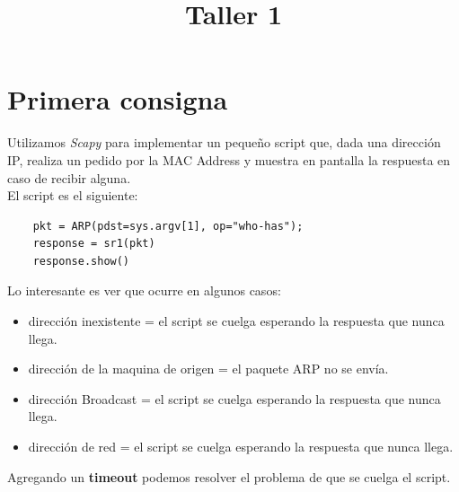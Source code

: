 \documentclass[a4paper]{article}
\title{Taller 1}
\begin{document}


\maketitle

\newpage

\tableofcontents


\beg

\newpage

\section{Primera consigna}

Utilizamos \textit{Scapy} para implementar un pequeño script que, dada una dirección IP, realiza un pedido por la MAC Address y muestra en pantalla la respuesta en caso de recibir alguna.\\

El script es el siguiente:

\begin{verbatim}
	pkt = ARP(pdst=sys.argv[1], op="who-has");
	response = sr1(pkt)
	response.show()
\end{verbatim}

Lo interesante es ver que ocurre en algunos casos:

\begin{itemize}
\item dirección inexistente = el script se cuelga esperando la respuesta que nunca llega. 
\item dirección de la maquina de origen = el paquete ARP no se envía.
\item dirección Broadcast = el script se cuelga esperando la respuesta que nunca llega. 
\item dirección de red = el script se cuelga esperando la respuesta que nunca llega. 
\end{itemize}

Agregando un \textbf{timeout} podemos resolver el problema de que se cuelga el script.
\end{document}
